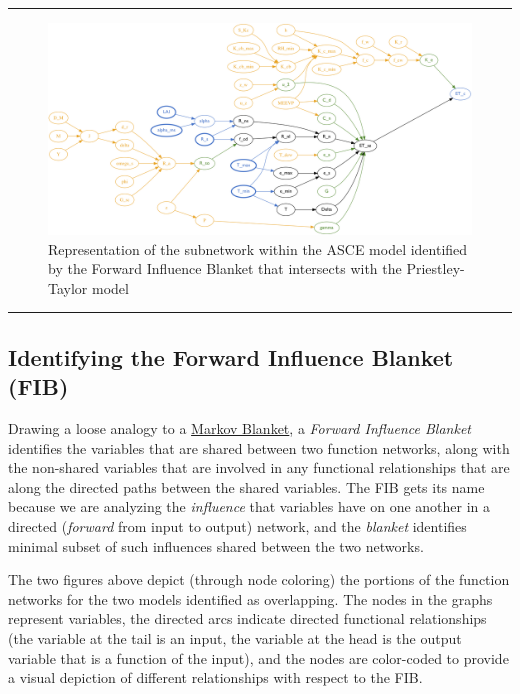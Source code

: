 \documentclass[article, 12pt, oneside]{memoir}
\begin{document}
\begin{center}\rule{0.5\linewidth}{\linethickness}\end{center}

\begin{figure}
\centering
\includegraphics{figs/full-asce-cmb.png}
\caption{Representation of the subnetwork within the ASCE model
identified by the Forward Influence Blanket that intersects with the
Priestley-Taylor model}
\end{figure}

\begin{center}\rule{0.5\linewidth}{\linethickness}\end{center}

\hypertarget{identifying-the-forward-influence-blanket-fib}{%
\subsection{Identifying the Forward Influence Blanket
(FIB)}\label{identifying-the-forward-influence-blanket-fib}}

Drawing a loose analogy to a
\href{https://en.wikipedia.org/wiki/Markov_blanket}{Markov Blanket}, a
\emph{Forward Influence Blanket} identifies the variables that are
shared between two function networks, along with the non-shared
variables that are involved in any functional relationships that are
along the directed paths between the shared variables. The FIB gets its
name because we are analyzing the \emph{influence} that variables have
on one another in a directed (\emph{forward} from input to output)
network, and the \emph{blanket} identifies minimal subset of such
influences shared between the two networks.

The two figures above depict (through node coloring) the portions of the
function networks for the two models identified as overlapping. The
nodes in the graphs represent variables, the directed arcs indicate
directed functional relationships (the variable at the tail is an input,
the variable at the head is the output variable that is a function of
the input), and the nodes are color-coded to provide a visual depiction
of different relationships with respect to the FIB.
\end{document}
